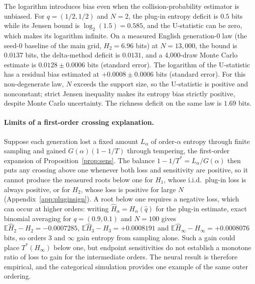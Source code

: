 \documentclass[10pt]{article}
\theoremstyle{plain}
\theoremstyle{definition}
\newcommand{\E}{\mathbb{E}}
\newcommand{\Htwo}{H_2}
\newcommand{\Hinf}{H_\infty}
\begin{document}
The logarithm introduces bias even when the collision-probability estimator is unbiased. For
$q=(1/2,1/2)$ and $N=2$, the plug-in entropy deficit is $0.5$ bits while its Jensen bound is
$\log_2(1.5)=0.585$, and the U-statistic can be zero, which makes its logarithm infinite. On a
measured English generation-0 law (the seed-0 baseline of the main grid, $\Htwo=6.96$ bits) at
$N=13{,}000$, the bound is $0.0137$ bits, the delta-method deficit is $0.0131$, and a
4,000-draw Monte Carlo estimate is $0.0128\pm0.0006$ bits (standard error). The logarithm of the U-statistic has a
residual bias estimated at $+0.0008\pm0.0006$ bits (standard error). For this non-degenerate law, $N$ exceeds
the support size, so the U-statistic is positive and nonconstant; strict Jensen inequality
makes its entropy bias strictly positive, despite Monte Carlo uncertainty. The
richness deficit on the same law is $1.69$ bits.

\paragraph{Limits of a first-order crossing explanation.} Suppose each generation lost a fixed
amount $L_\alpha$ of order-$\alpha$ entropy through finite sampling and gained $G(\alpha)(1-1/T)$
through tempering, the first-order expansion of Proposition~\ref{prop:sens}. The balance
$1-1/T^\ast=L_\alpha/G(\alpha)$ then puts any crossing above one whenever both loss and
sensitivity are positive, so it cannot produce the measured roots below one for $H_1$, whose
i.i.d.\ plug-in loss is always positive, or for $\Htwo$, whose loss is positive for large $N$
(Appendix~\ref{app:pluginsign}). A root below one requires a negative loss, which can occur at
higher orders: writing $\hat H_\alpha=H_\alpha(\hat q)$ for the plug-in estimate, exact binomial averaging for $q=(0.9,0.1)$ and $N=100$ gives
$\E\hat H_2-H_2=-0.0007285$, $\E\hat H_3-H_3=+0.0008191$ and $\E\hat H_\infty-H_\infty=+0.0008076$
bits, so orders 3 and $\infty$ gain entropy from sampling alone. Such a gain could place
$T^\ast(\Hinf)$ below one, but endpoint sensitivities do not establish a monotone ratio of loss
to gain for the intermediate orders. The
neural result is therefore empirical, and the categorical simulation provides one example of the
same outer ordering.
\end{document}
